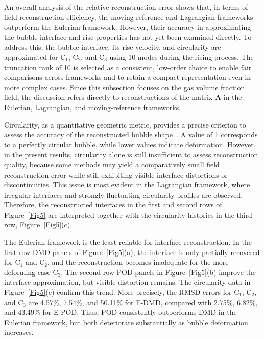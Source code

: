 \documentclass[a4paper,fleqn]{cas-sc}
\begin{document}
	An overall analysis of the relative reconstruction error shows that, in terms of field reconstruction efficiency, the moving-reference and Lagrangian frameworks outperform the Eulerian framework. However, their accuracy in approximating the bubble interface and rise properties has not yet been examined directly. To address this, the bubble interface, its rise velocity, and circularity are approximated for C$_1$, C$_2$, and C$_3$ using 10 modes during the rising process. The truncation rank of 10 is selected as a consistent, low-order choice to enable fair comparisons across frameworks and to retain a compact representation even in more complex cases. Since this subsection focuses on the gas volume fraction field, the discussion refers directly to reconstructions of the matrix $\mathbf{A}$ in the Eulerian, Lagrangian, and moving-reference frameworks.
	
	Circularity, as a quantitative geometric metric, provides a precise criterion to assess the accuracy of the reconstructed bubble shape~\cite{Hysing2009}. A value of 1 corresponds to a perfectly circular bubble, while lower values indicate deformation. However, in the present results, circularity alone is still insufficient to assess reconstruction quality, because some methods may yield a comparatively small field reconstruction error while still exhibiting visible interface distortions or discontinuities. This issue is most evident in the Lagrangian framework, where irregular interfaces and strongly fluctuating circularity profiles are observed. Therefore, the reconstructed interfaces in the first and second rows of Figure~\ref{Fig5} are interpreted together with the circularity histories in the third row, Figure~\ref{Fig5}(c).

	The Eulerian framework is the least reliable for interface reconstruction. In the first-row DMD panels of Figure~\ref{Fig5}(a), the interface is only partially recovered for C$_1$ and C$_2$, and the reconstruction becomes inadequate for the more deforming case C$_3$. The second-row POD panels in Figure~\ref{Fig5}(b) improve the interface approximation, but visible distortion remains. The circularity data in Figure~\ref{Fig5}(c) confirm this trend. More precisely, the RMSD errors for C$_1$, C$_2$, and C$_3$ are 4.57\%, 7.54\%, and 50.11\% for E-DMD, compared with 2.75\%, 6.82\%, and 43.49\% for E-POD. Thus, POD consistently outperforms DMD in the Eulerian framework, but both deteriorate substantially as bubble deformation increases.
	
\end{document}
